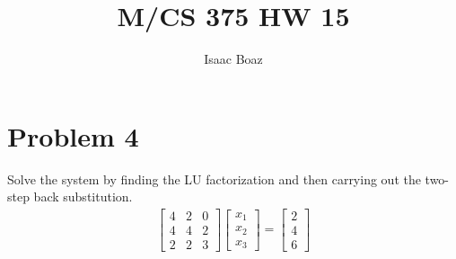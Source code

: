 \documentclass{article}
\title{\vspace{-5ex}M/CS 375 HW 15}
\author{Isaac Boaz}
\begin{document}
\maketitle

\section*{Problem 4}
Solve the system by finding the LU factorization and then carrying out the two-step back substitution.
\begin{align*}
    \begin{bmatrix}
        4 & 2 & 0 \\
        4& 4 & 2 \\
        2 & 2 & 3
    \end{bmatrix}
    \begin{bmatrix}
        x_1 \\
        x_2 \\
        x_3
    \end{bmatrix}
    = 
    \begin{bmatrix}
        2 \\
        4 \\
        6
    \end{bmatrix}
\end{align*}
\end{document}
